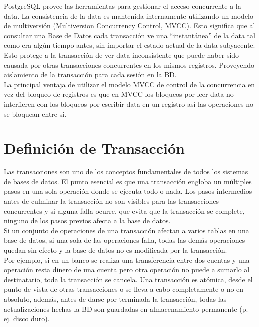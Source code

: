 PostgreSQL provee las herramientas para gestionar el acceso concurrente a la data. La consistencia de la data es mantenida internamente utilizando un modelo de multiversión (Multiversion Concurrency Control, MVCC). Esto significa que al consultar una Base de Datos cada transacción ve una “instantánea” de la data tal como era algún tiempo antes, sin importar el estado actual de la data subyacente. Esto protege a la transacción de ver data inconsistente que puede haber sido causada por otras transacciones concurrentes en los mismos registros. Proveyendo aislamiento de la transacción para cada sesión en la BD.\\

La principal ventaja de utilizar el modelo MVCC de control de la concurrencia en vez del bloqueo de registros es que en MVCC los bloqueos por leer data no interfieren con los bloqueos por escribir data en un registro así las operaciones no se bloquean entre si. \cite{Group2013}

\section{Definición de Transacción}

Las transacciones son uno de los conceptos fundamentales de todos los sistemas de bases de datos. El punto esencial es que una transacción engloba un múltiples pasos en una sola operación donde se ejecuta todo o nada.  Los pasos intermedios antes de culminar la transacción no son visibles para las transacciones concurrentes y si alguna falla ocurre, que evita que la transacción se complete, ninguno de los pasos previos afecta a la base de datos.\\

Si un conjunto de operaciones de una transacción afectan a varios tablas en una base de datos, si una sola de las operaciones falla, todas las demás operaciones quedan sin efecto y la base de datos no es modificada por la transacción.\\

Por ejemplo, si en un banco se realiza una transferencia entre dos cuentas y una operación resta dinero de una cuenta pero otra operación no puede a sumarlo al destinatario, toda la transacción se cancela. Una transacción es atómica, desde el punto de vista de otras transacciones o se lleva a cabo completamente o no en absoluto, además, antes de darse por terminada la transacción, todas las actualizaciones hechas la BD son guardadas en almacenamiento permanente (p. ej. disco duro).\\

